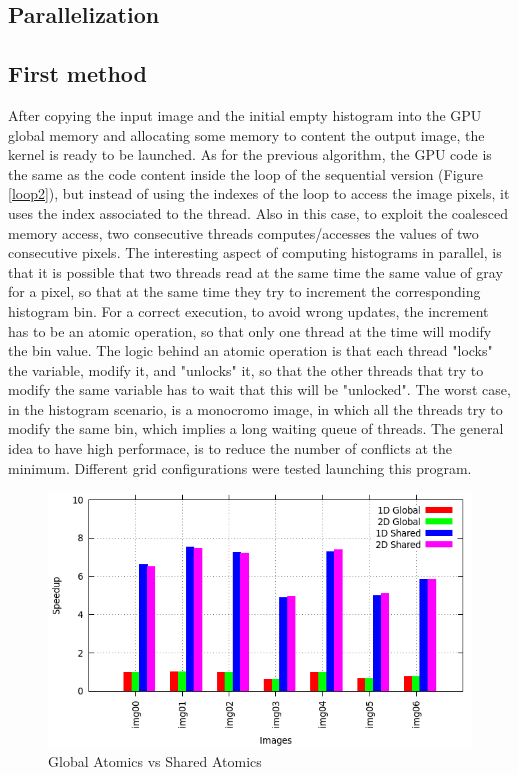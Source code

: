 \documentclass[a4paper]{article}
\begin{document}
\subsection{Parallelization}
\label{sec:p2}
\subsection{First method}
\label{sec:fm2}
After copying the input image and the initial empty histogram into the GPU global memory and allocating some memory to content the output image, the kernel is ready to be launched. As for the previous algorithm, the GPU code is the same as the code content inside the loop of the sequential version (Figure \ref{loop2}), but instead of using the indexes of the loop to access the image pixels, it uses the index associated to the thread. Also in this case, to exploit the coalesced memory access, two consecutive threads computes/accesses the values of two consecutive pixels. The interesting aspect of computing histograms in parallel, is that it is possible that two threads read at the same time the same value of gray for a pixel, so that at the same time they try to increment the corresponding histogram bin. For a correct execution, to avoid wrong updates, the increment has to be an atomic operation, so that only one thread at the time will modify the bin value. 
The logic behind an atomic operation is that each thread "locks" the variable, modify it, and "unlocks" it, so that the other threads that try to modify the same variable has to wait that this will be "unlocked". The worst case, in the histogram scenario, is a monocromo image, in which all the threads try to modify the same bin, which implies a long waiting queue of threads. The general idea to have high performace, is to reduce the number of conflicts at the minimum.
Different grid configurations were tested launching this program.

\begin{figure}[!ht]
    \centering
    \includegraphics[width=0.7\linewidth]{res/new/histogram_confronto}
    \caption{Global Atomics vs Shared Atomics}
    \label{fig:gavsa}
\end{figure}
\FloatBarrier
\end{document}
